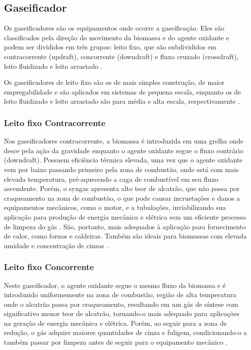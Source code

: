 \subsection{Gaseificador}
Os gaseificadores são os equipamentos onde ocorre a gaseificação. Eles são classificados pela direção do movimento da biomassa e do agente oxidante e podem ser divididos em três grupos: leito fixo, que são subdivididos em contracorrente (updraft), concorrente (downdraft) e fluxo cruzado (crossdraft), leito fluidizado e leito arrastado \cite{higman2007}.
 
Os gaseificadores de leito fixo são os de mais simples construção, de maior empregabilidade e são aplicados em sistemas de pequena escala, enquanto os de leito fluidizado e leito arrastado são para média e alta escala, respectivamente \cite{basu2010}. 


\subsubsection{Leito fixo Contracorrente}

Nos gaseificadores contracorrente, a biomassa é introduzida em uma grelha onde desce pela ação da gravidade enquanto o agente oxidante segue o fluxo contrário (downdraft). Possuem eficiência térmica elevada, uma vez que o agente oxidante vem por baixo passando primeiro pela zona de combustão, onde está com mais elevada temperatura, pré-aquecendo a caga de combustível em seu fluxo ascendente. Porém, o syngas apresenta alto teor de alcatrão, que não passa por craqueamento na zona de combustão, o que pode causar incrustações e danos a equipamentos  mecânicos, como o motor, e a tubulações, inviabilizando sua aplicação para produção de energia mecânica e elétrica sem um eficiente processo de limpeza do gás \cite{sanchez2010}. São, portanto, mais adequados à aplicação para fornecimento de calor, como fornos e caldeiras. Também são ideais para biomassas com elevada umidade e concentração de cinzas \cite{basu2010}.



\subsubsection{Leito fixo Concorrente}

Neste gaseificador, o agente oxidante segue o mesmo fluxo da biomassa e é introduzido uniformemente na zona de combustão, região de alta temperatura onde o alcatrão passa por craqueamento, resultando em um gás de síntese com significativo menor teor de alcatrão, tornando-o mais adequado para aplicações na geração de energia mecânica e elétrica. Porém, ao seguir para a zona de redução, o gás adquire maiores quantidades de cinza e fuligem, condicionando-o a também passar por limpeza antes de seguir para o equipamento mecânico \cite{sanchez2010}.


